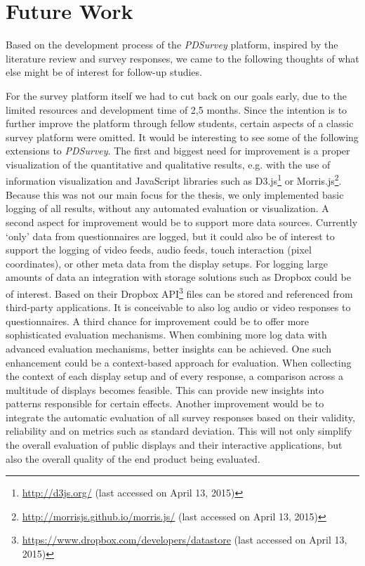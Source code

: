 \section{Future Work}
\label{chapter:future-work}
	
Based on the development process of the \textit{PDSurvey} platform, inspired by the literature review and survey responses, we came to the following thoughts of what else might be of interest for follow-up studies.


For the survey platform itself we had to cut back on our goals early, due to the limited resources and development time of 2,5 months. Since the intention is to further improve the platform through fellow students, certain aspects of a classic survey platform were omitted. It would be interesting to see some of the following extensions to \textit{PDSurvey}.
The first and biggest need for improvement is a proper visualization of the quantitative and qualitative results, e.g. with the use of information visualization and JavaScript libraries such as D3.js\footnote{\url{http://d3js.org/} (last accessed on April 13, 2015)} or Morris.js\footnote{\url{http://morrisjs.github.io/morris.js/} (last accessed on April 13, 2015)}. Because this was not our main focus for the thesis, we only implemented basic logging of all results, without any automated evaluation or visualization.
A second aspect for improvement would be to support more data sources. Currently `only' data from questionnaires are logged, but it could also be of interest to support the logging of video feeds, audio feeds, touch interaction (pixel coordinates), or other meta data from the display setups. For logging large amounts of data an integration with storage solutions such as Dropbox could be of interest. Based on their Dropbox API\footnote{\url{https://www.dropbox.com/developers/datastore} (last accessed on April 13, 2015)} files can be stored and referenced from third-party applications. It is conceivable to also log audio or video responses to questionnaires.
A third chance for improvement could be to offer more sophisticated evaluation mechanisms. When combining more log data with advanced evaluation mechanisms, better insights can be achieved. One such enhancement could be a context-based approach for evaluation. When collecting the context of each display setup and of every response, a comparison across a multitude of displays becomes feasible. This can provide new insights into patterns responsible for certain effects. Another improvement would be to integrate the automatic evaluation of all survey responses based on their validity, reliability and on metrics such as standard deviation. This will not only simplify the overall evaluation of public displays and their interactive applications, but also the overall quality of the end product being evaluated.
